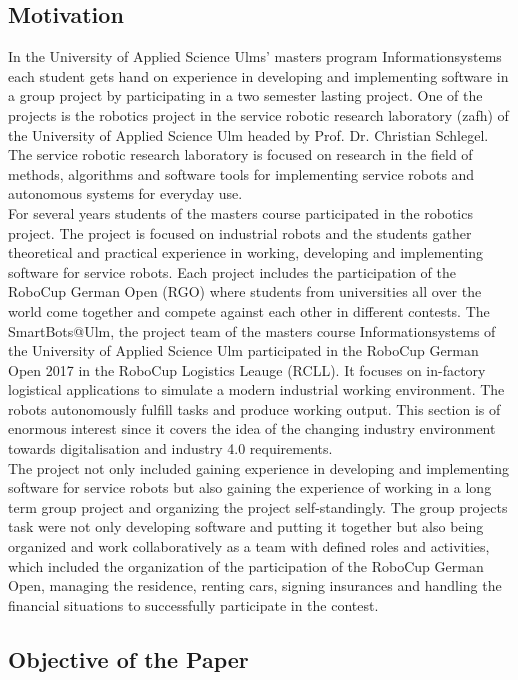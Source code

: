 \subsection{Motivation}

In the University of Applied Science Ulms' masters program Informationsystems each student gets hand on experience in developing and implementing software in a group project by participating in a two semester lasting project. One of the projects is the robotics project in the service robotic research laboratory (zafh) of the University of Applied Science Ulm headed by Prof. Dr. Christian Schlegel. The service robotic research laboratory is focused on research in the field of methods, algorithms and software tools for implementing service robots and autonomous systems for everyday use. \\
For several years students of the masters course participated in the robotics project. The project is focused on industrial robots and the students gather theoretical and practical experience in working, developing and implementing software for service robots. Each project includes the participation of the RoboCup German Open (RGO) where students from universities all over the world come together and compete against each other in different contests. The SmartBots@Ulm, the project team of the masters course Informationsystems of the University of Applied Science Ulm participated in the RoboCup German Open 2017 in the RoboCup Logistics Leauge (RCLL). It focuses on in-factory logistical applications to simulate a modern industrial working environment. The robots autonomously fulfill tasks and produce working output. This section is of enormous interest since it covers the idea of the changing industry environment towards digitalisation and industry 4.0 requirements. \\
The project not only included gaining experience in developing and implementing software for service robots but also gaining the experience of working in a long term group project and organizing the project self-standingly. The group projects task were not only developing software and putting it together but also being organized and work collaboratively as a team with defined roles and activities, which included the organization of the participation of the RoboCup German Open, managing the residence, renting cars, signing insurances and handling the financial situations to successfully participate in the contest. 

\subsection{Objective of the Paper}

